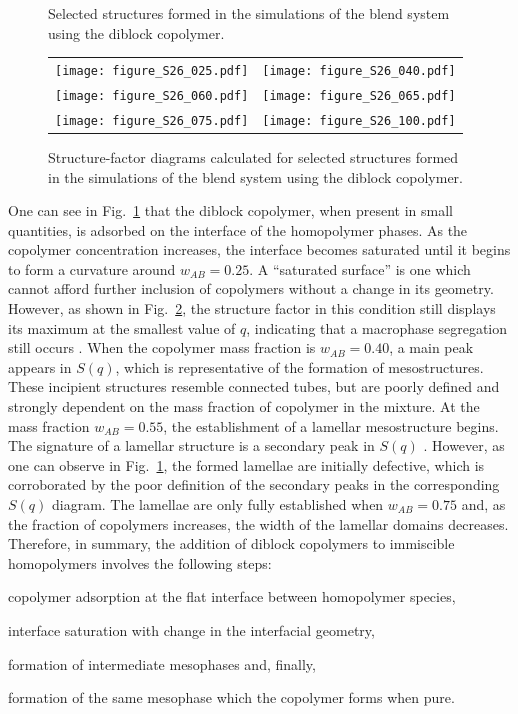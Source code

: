 \documentclass[
journal=mamobx,
manuscript=article,
]{achemso}
\begin{document}
\begin{figure}
\begin{tabular}{C{1.6in}@{}C{1.6in}}
	\end{tabular}
	\caption{Selected structures formed in the simulations of the blend system using the  diblock copolymer.}
	\label{fig:Figure_2}
\end{figure}

\begin{figure}
	\centering
	\begin{tabular}{C{1.6in}@{}C{1.6in}}
		\texttt{[image: figure\_S26\_025.pdf]} & \texttt{[image: figure\_S26\_040.pdf]} \\
		\texttt{[image: figure\_S26\_060.pdf]} & \texttt{[image: figure\_S26\_065.pdf]} \\		\texttt{[image: figure\_S26\_075.pdf]} & \texttt{[image: figure\_S26\_100.pdf]} \\	
	\end{tabular}
	\caption{Structure-factor diagrams calculated for selected structures formed in the simulations of the blend system using the  diblock copolymer.}
	\label{fig:Figure_3}
\end{figure}

One can see in Fig.~\ref{fig:Figure_2} that the diblock copolymer, when present in small quantities, is adsorbed on the interface of the homopolymer phases.
As the copolymer concentration increases, the interface becomes saturated until it begins to form a curvature around $w_{AB}=0.25$.
A ``saturated surface'' is one which cannot afford further inclusion of copolymers without a change in its geometry.
However, as shown in Fig.~\ref{fig:Figure_3}, the structure factor in this condition still displays its maximum at the smallest value of $q$, indicating that a macrophase segregation still occurs \cite{Gavrilov_2013, Lemos_2020}.
When the copolymer mass fraction is $w_{AB}=0.40$, a main peak appears in $S(q)$, which is representative of the formation of mesostructures.
These incipient structures resemble connected tubes, but are poorly defined and strongly dependent on the mass fraction of copolymer in the mixture. 
At the mass fraction $w_{AB}=0.55$, the establishment of a lamellar mesostructure begins.
The signature of a lamellar structure is a secondary peak in $S(q)$ \cite{Gavrilov_2013, Lemos_2020}.
However, as one can observe in Fig.~\ref{fig:Figure_2}, the formed lamellae are initially defective, which is corroborated by the poor definition of the secondary peaks in the corresponding $S(q)$ diagram.
The lamellae are only fully established when $w_{AB}=0.75$ and, as the fraction of copolymers increases, the width of the lamellar domains decreases.
Therefore, in summary, the addition of diblock copolymers to immiscible homopolymers involves the following steps: \begin{enumerate*}[label=\roman*)] \item copolymer adsorption at the flat interface between homopolymer species, \item interface saturation with change in the interfacial geometry, \item formation of intermediate mesophases and, finally, \item formation of the same mesophase which the copolymer forms when pure.\end{enumerate*}
\end{document}
